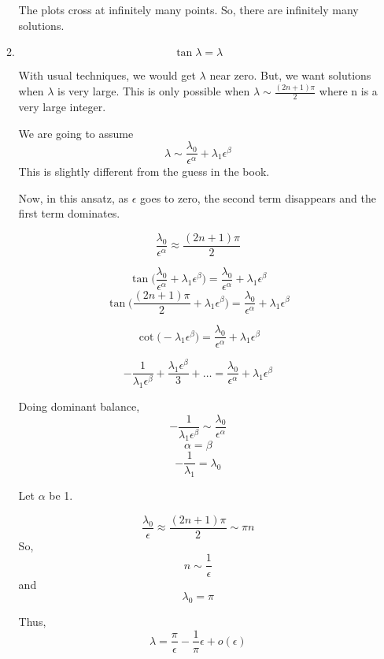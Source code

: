 \documentclass[letterpaper,12pt]{article}
\begin{document}
\begin{enumerate}
\begin{enumerate}
The plots cross at infinitely many points. So, there are infinitely many solutions.
\item

\[\tan \lambda = \lambda \]

With usual techniques, we would get $\lambda$ near zero. But, we want solutions when $\lambda$ is very large. This is only possible when $\lambda \sim \frac{(2n+1)\pi}{2}$ where n is a very large integer.

We are going to assume
\[\lambda \sim \frac{\lambda_0}{\epsilon^\alpha}+ \lambda_1 \epsilon^\beta  \]
This is slightly different from the guess in the book.

Now, in this ansatz, as $\epsilon$ goes to zero, the second term disappears and the first term dominates.

\[ \frac{\lambda_0}{\epsilon^\alpha} \approx  \frac{(2n+1)\pi}{2} \]

\[\tan \bigg(\frac{\lambda_0}{\epsilon^\alpha}+ \lambda_1 \epsilon^\beta  \bigg) = \frac{\lambda_0}{\epsilon^\alpha}+ \lambda_1 \epsilon^\beta \]
\[ \tan \bigg(\frac{(2n+1)\pi}{2}+ \lambda_1 \epsilon^\beta  \bigg) =\frac{\lambda_0}{\epsilon^\alpha}+ \lambda_1 \epsilon^\beta \]

\[ \cot \bigg(- \lambda_1 \epsilon^\beta  \bigg) =\frac{\lambda_0}{\epsilon^\alpha}+ \lambda_1 \epsilon^\beta \]

\[-\frac{1}{\lambda_1 \epsilon^\beta }+ \frac{\lambda_1 \epsilon^\beta}{3}+ \hdots  =\frac{\lambda_0}{\epsilon^\alpha}+ \lambda_1 \epsilon^\beta \]

Doing dominant balance,
\[-\frac{1}{\lambda_1 \epsilon^\beta } \sim  \frac{\lambda_0}{\epsilon^\alpha}\]
\[\alpha = \beta \]
\[-\frac{1}{\lambda_1  }= \lambda_0 \]

Let $\alpha $ be 1.

\[ \frac{\lambda_0}{\epsilon} \approx  \frac{(2n+1)\pi}{2} \sim  \pi n\]
So,
\[n \sim \frac{1}{\epsilon} \]
and
\[\lambda_0 = \pi \]

Thus,
\[\lambda =  \frac{\pi}{\epsilon}-\frac{1}{\pi} \epsilon + o(\epsilon)\]


 \end{enumerate}
\end{enumerate}
\end{document}
